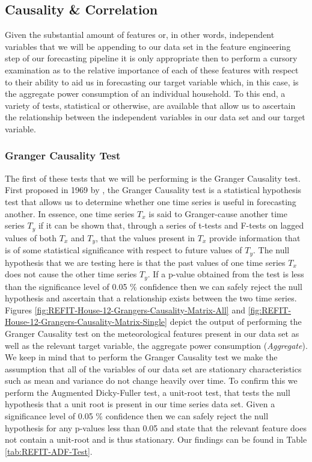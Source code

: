\subsection{Causality \& Correlation}
\label{subsec:Exploratory-Data-Analysis:REFIT:Causality-and-Correlation}
Given the substantial amount of features or, in other words, independent variables that we will be appending to our data set in the feature engineering step of our forecasting pipeline it is only appropriate then to perform a cursory examination as to the relative importance of each of these features with respect to their ability to aid us in forecasting our target variable which, in this case, is the aggregate power consumption of an individual household. To this end, a variety of tests, statistical or otherwise, are available that allow us to ascertain the relationship between the independent variables in our data set and our target variable.

\subsubsection{Granger Causality Test}
\label{subsubsec:Exploratory-Data-Analysis:REFIT:Causality-and-Correlation:Grangers-Causality-Test}
The first of these tests that we will be performing is the Granger Causality test. First proposed in 1969 by \citet{Granger}, the Granger Causality test is a statistical hypothesis test that allows us to determine whether one time series is useful in forecasting another. In essence, one time series $T_x$ is said to Granger-cause another time series $T_y$ if it can be shown that, through a series of t-tests and F-tests on lagged values of both $T_x$ and $T_y$, that the values present in $T_x$ provide information that is of some statistical significance with respect to future values of $T_y$. The null hypothesis that we are testing here is that the past values of one time series $T_x$ does not cause the other time series $T_y$. If a p-value obtained from the test is less than the significance level of 0.05 \% confidence then we can safely reject the null hypothesis and ascertain that a relationship exists between the two time series. Figures \ref{fig:REFIT-House-12-Grangers-Causality-Matrix-All} and \ref{fig:REFIT-House-12-Grangers-Causality-Matrix-Single} depict the output of performing the Granger Causality test on the meteorological features present in our data set as well as the relevant target variable, the aggregate power consumption (\textit{Aggregate}). We keep in mind that to perform the Granger Causality test we make the assumption that all of the variables of our data set are stationary \ie characteristics such as mean and variance do not change heavily over time. To confirm this we perform the Augmented Dicky-Fuller test, a unit-root test, that tests the null hypothesis that a unit root is present in our time series data set. Given a significance level of 0.05 \% confidence then we can safely reject the null hypothesis for any p-values less than 0.05 and state that the relevant feature does not contain a unit-root and is thus stationary. Our findings can be found in Table \ref{tab:REFIT-ADF-Test}.

